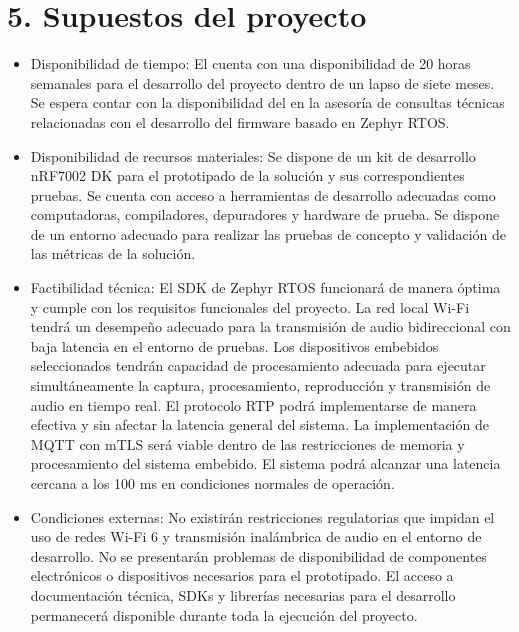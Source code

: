 \documentclass[
11pt, %
]{charter}
\begin{document}
\section{5. Supuestos del proyecto}
\label{sec:supuestos}

\begin{itemize}
	\item Disponibilidad de tiempo:
		\subitem El \authorname{} cuenta con una disponibilidad de 20 horas semanales para el desarrollo del proyecto dentro de un lapso de siete meses.
		\subitem Se espera contar con la disponibilidad del \supname{} en la asesoría de consultas técnicas relacionadas con el desarrollo del firmware basado en Zephyr RTOS.
		
	\item Disponibilidad de recursos materiales:
		\subitem Se dispone de un kit de desarrollo nRF7002 DK para el prototipado de la solución y sus correspondientes pruebas.
		\subitem Se cuenta con acceso a herramientas de desarrollo adecuadas como computadoras, compiladores, depuradores y hardware de prueba.
		\subitem Se dispone de un entorno adecuado para realizar las pruebas de concepto y validación de las métricas de la solución.
		
	\item Factibilidad técnica:
		\subitem El SDK de Zephyr RTOS funcionará de manera óptima y cumple con los requisitos funcionales del proyecto.
		\subitem La red local Wi-Fi tendrá un desempeño adecuado para la transmisión de audio bidireccional con baja latencia en el entorno de pruebas.
		\subitem Los dispositivos embebidos seleccionados tendrán capacidad de procesamiento adecuada para ejecutar simultáneamente la captura, procesamiento, reproducción y transmisión de audio en tiempo real.
		\subitem El protocolo RTP podrá implementarse de manera efectiva y sin afectar la latencia general del sistema.
		\subitem La implementación de MQTT con mTLS será viable dentro de las restricciones de memoria y procesamiento del sistema embebido.
		\subitem El sistema podrá alcanzar una latencia cercana a los 100 ms en condiciones normales de operación.
		
	\item Condiciones externas:
		\subitem No existirán restricciones regulatorias que impidan el uso de redes Wi-Fi 6 y transmisión inalámbrica de audio en el entorno de desarrollo.
		\subitem No se presentarán problemas de disponibilidad de componentes electrónicos o dispositivos necesarios para el prototipado.
		\subitem El acceso a documentación técnica, SDKs y librerías necesarias para el desarrollo permanecerá disponible durante toda la ejecución del proyecto.
		
\end{itemize}
\end{document}
